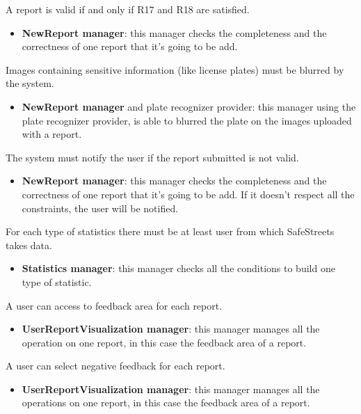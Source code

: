 \documentclass[../RASD.tex]{subfiles}
\begin{document}
\begin{enumerate}
         A report is valid if and only if R17 and R18 are satisfied.
        \begin{itemize}
            \item \textbf{NewReport manager}: this manager checks the completeness and the correctness of one report that it’s going to be add.
        \end{itemize}

         Images containing sensitive information (like license plates) must be blurred by the system.
        \begin{itemize}
            \item \textbf{NewReport manager} and plate recognizer provider: this manager using the plate recognizer provider, is able to blurred the plate on the images uploaded with a report.
        \end{itemize}

         The system must notify the user if the report submitted is not valid.
        \begin{itemize}
            \item \textbf{NewReport manager}: this manager checks the completeness and the correctness of one report that it’s going to be add. If it doesn’t respect all the constraints, the user will be notified.
        \end{itemize}

         For each type of statistics there must be at least user from which SafeStreets takes data.
        \begin{itemize}
            \item \textbf{Statistics manager}: this manager checks all the conditions to build one type of statistic.
        \end{itemize}

         A user can access to feedback area for each report.
        \begin{itemize}
            \item \textbf{UserReportVisualization manager}: this manager manages all the operation on one report, in this case the feedback area of a report.
        \end{itemize}

         A user can select negative feedback for each report.
        \begin{itemize}
            \item \textbf{UserReportVisualization manager}: this manager manages all the operations on one report, in this case the feedback area of a report.
        \end{itemize}


\end{enumerate}
\end{document}
